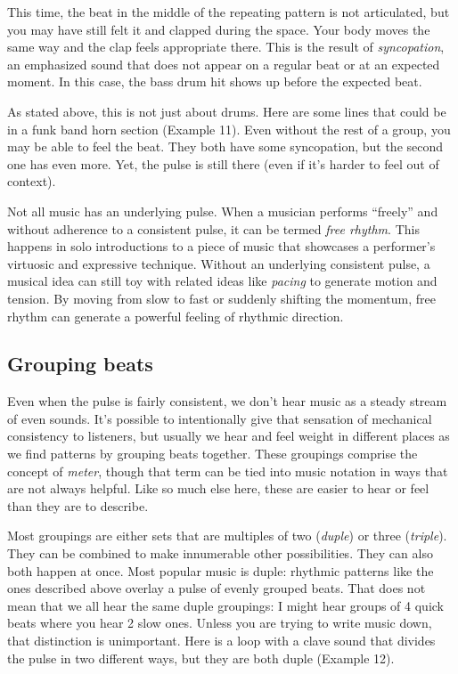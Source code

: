 \documentclass[twoside]{article}
\begin{document}
This time, the beat in the middle of the repeating pattern is not
articulated, but you may have still felt it and clapped during the
space. Your body moves the same way and the clap feels appropriate
there. This is the result of \emph{syncopation}, an emphasized sound
that does not appear on a regular beat or at an expected moment. In this
case, the bass drum hit shows up before the expected beat.

As stated above, this is not just about drums. Here are some lines that
could be in a funk band horn section (Example 11). Even without the rest of a group,
you may be able to feel the beat. They both have some syncopation, but
the second one has even more. Yet, the pulse is still there (even if
it's harder to feel out of context).

Not all music has an underlying pulse. When a musician performs
``freely'' and without adherence to a consistent pulse, it can be termed
\emph{free rhythm}. This happens in solo introductions to a piece of
music that showcases a performer's virtuosic and expressive technique.
Without an underlying consistent pulse, a musical idea can still toy
with related ideas like \emph{pacing} to generate motion and tension. By
moving from slow to fast or suddenly shifting the momentum, free rhythm
can generate a powerful feeling of rhythmic direction.

\hypertarget{grouping-beats}{%
\subsection*{Grouping beats}\label{grouping-beats}}

Even when the pulse is fairly consistent, we don't hear music as a
steady stream of even sounds. It's possible to intentionally give that
sensation of mechanical consistency to listeners, but usually we hear
and feel weight in different places as we find patterns by grouping
beats together. These groupings comprise the concept of \emph{meter},
though that term can be tied into music notation in ways that are not
always helpful. Like so much else here, these are easier to hear or feel
than they are to describe.

Most groupings are either sets that are multiples of two (\emph{duple})
or three (\emph{triple}). They can be combined to make innumerable other
possibilities. They can also both happen at once. Most popular music is
duple: rhythmic patterns like the ones described above overlay a pulse
of evenly grouped beats. That does not mean that we all hear the same
duple groupings: I might hear groups of 4 quick beats where you hear 2
slow ones. Unless you are trying to write music down, that distinction
is unimportant. Here is a loop with a clave sound that divides the pulse
in two different ways, but they are both duple (Example 12).
\end{document}
